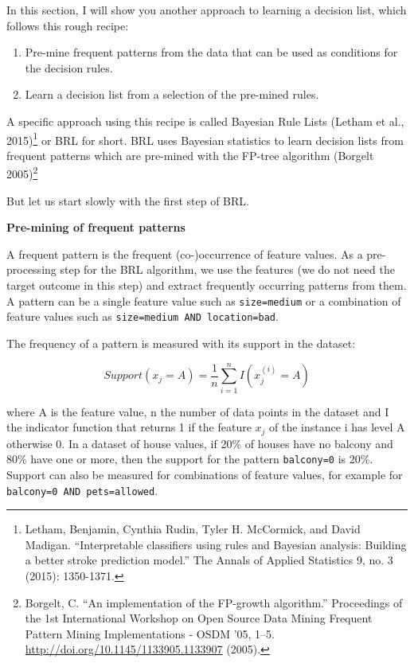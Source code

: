 \documentclass[
  10pt,
]{scrbook}
\providecommand{\tightlist}{%
  \setlength{\itemsep}{0pt}\setlength{\parskip}{0pt}}
\begin{document}
In this section, I will show you another approach to learning a decision list, which follows this rough recipe:

\begin{enumerate}
\def\labelenumi{\arabic{enumi}.}
\tightlist
\item
  Pre-mine frequent patterns from the data that can be used as conditions for the decision rules.
\item
  Learn a decision list from a selection of the pre-mined rules.
\end{enumerate}

A specific approach using this recipe is called Bayesian Rule Lists (Letham et al., 2015)\footnote{Letham, Benjamin, Cynthia Rudin, Tyler H. McCormick, and David Madigan. ``Interpretable classifiers using rules and Bayesian analysis: Building a better stroke prediction model.'' The Annals of Applied Statistics 9, no. 3 (2015): 1350-1371.} or BRL for short.
BRL uses Bayesian statistics to learn decision lists from frequent patterns which are pre-mined with the FP-tree algorithm (Borgelt 2005)\footnote{Borgelt, C. ``An implementation of the FP-growth algorithm.'' Proceedings of the 1st International Workshop on Open Source Data Mining Frequent Pattern Mining Implementations - OSDM '05, 1--5. \url{http://doi.org/10.1145/1133905.1133907} (2005).}

But let us start slowly with the first step of BRL.

\textbf{Pre-mining of frequent patterns}

A frequent pattern is the frequent (co-)occurrence of feature values.
As a pre-processing step for the BRL algorithm, we use the features (we do not need the target outcome in this step) and extract frequently occurring patterns from them.
A pattern can be a single feature value such as \texttt{size=medium} or a combination of feature values such as \texttt{size=medium\ AND\ location=bad}.

The frequency of a pattern is measured with its support in the dataset:

\[Support(x_j=A)=\frac{1}n{}\sum_{i=1}^nI(x^{(i)}_{j}=A)\]

where A is the feature value, n the number of data points in the dataset and I the indicator function that returns 1 if the feature \(x_j\) of the instance i has level A otherwise 0.
In a dataset of house values, if 20\% of houses have no balcony and 80\% have one or more, then the support for the pattern \texttt{balcony=0} is 20\%.
Support can also be measured for combinations of feature values, for example for \texttt{balcony=0\ AND\ pets=allowed}.
\end{document}
